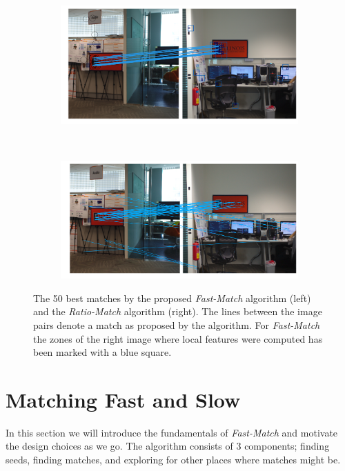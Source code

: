 \documentclass[10pt,twocolumn,letterpaper]{article}
\begin{document}
\begin{figure}[tb]
    \centering
    \begin{subfigure}[t]{0.5\columnwidth}
        \includegraphics[width=1\columnwidth]{images/Illinois-fastmatch}
    \end{subfigure}%
    ~%
    \begin{subfigure}[t]{0.5\columnwidth}
        \includegraphics[width=1\columnwidth]{images/Illinois-ratiomatch}
    \end{subfigure}%
    \caption{The 50 best matches by the proposed \emph{Fast-Match} algorithm (left) and the \emph{Ratio-Match} algorithm \cite{lowe2004sift} (right). The lines between the image pairs denote a match as proposed by the algorithm. For \emph{Fast-Match} the zones of the right image where local features were computed has been marked with a blue square.}
    \label{fig:match_example}
\end{figure}

\section{Matching Fast and Slow}
\label{algorithm}
%
In this section we will introduce the fundamentals of \emph{Fast-Match} and motivate the design choices as we go. The algorithm consists of 3 components; finding seeds, finding matches, and exploring for other places where matches might be.
\end{document}
